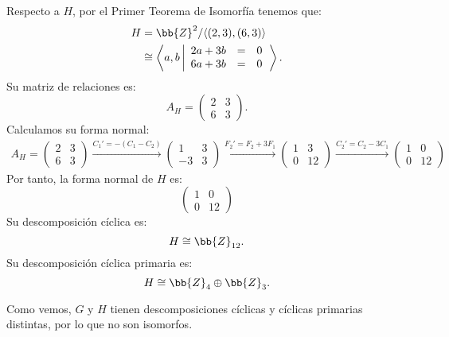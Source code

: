 \begin{ejercicio}
\begin{enumerate}
        Respecto a $H$, por el Primer Teorema de Isomorfía tenemos que:
        \begin{align*}
            H &= \bb{Z}^2/\langle(2, 3),(6, 3)\rangle \\
            &\cong \left\langle a, b \left|
                \begin{array}{rcl}
                    2a + 3b &=& 0 \\
                    6a + 3b &=& 0
                \end{array}
            \right.\right\rangle.
        \end{align*}
        Su matriz de relaciones es:
        \begin{equation*}
            A_H = \begin{pmatrix}
                2 & 3 \\
                6 & 3
            \end{pmatrix}.
        \end{equation*}
        Calculamos su forma normal:
        \begin{multline*}
            A_H = \begin{pmatrix}
                2 & 3 \\
                6 & 3
            \end{pmatrix}
            \xrightarrow{C_1'=-(C_1-C_2)}
            \begin{pmatrix}
                1 & 3\\
                -3 & 3
            \end{pmatrix}
            \xrightarrow{F_2'=F_2+3F_1}
            \begin{pmatrix}
                1 & 3\\
                0 & 12
            \end{pmatrix}
            \xrightarrow{C_2'=C_2-3C_1}
            \begin{pmatrix}
                1 & 0\\
                0 & 12
            \end{pmatrix}
        \end{multline*}
        Por tanto, la forma normal de $H$ es:
        \begin{equation*}
            \begin{pmatrix}
                1 & 0 \\
                0 & 12
            \end{pmatrix}
        \end{equation*}
        Su descomposición cíclica es:
        \begin{equation*}
            H \cong \bb{Z}_{12}.
        \end{equation*}
        Su descomposición cíclica primaria es:
        \begin{equation*}
            H \cong \bb{Z}_4 \oplus \bb{Z}_3.
        \end{equation*}

        Como vemos, $G$ y $H$ tienen descomposiciones cíclicas y cíclicas primarias distintas, por lo que no son isomorfos.
    \end{enumerate}
\end{ejercicio}

